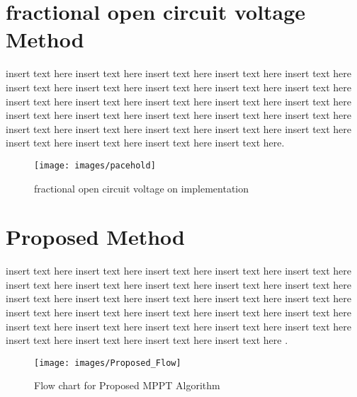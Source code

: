  \section{fractional open circuit voltage Method }
 insert text here insert text here insert text here insert text here insert text here
 insert text here insert text here insert text here insert text here insert text here insert text here insert text here insert text here insert text here insert text here insert text here insert text here insert text here insert text here insert text here insert text here insert text here insert text here insert text here insert text here insert text here insert text here insert text here insert text here.   \\
 \begin{figure}[H]
  \begin{center}
  \texttt{[image: images/pacehold]}
  \caption{ fractional open circuit voltage on implementation}
  \label{fig:Frac_oc_result}
  \end{center}
  \end{figure}
\section{Proposed Method }
insert text here insert text here insert text here insert text here insert text here
insert text here insert text here insert text here insert text here insert text here insert text here insert text here insert text here insert text here insert text here insert text here insert text here insert text here insert text here insert text here insert text here insert text here insert text here insert text here insert text here insert text here insert text here insert text here insert text here . \\

  
  \begin{figure}[H]
   \begin{center}
   \texttt{[image: images/Proposed\_Flow]}
   \caption{ Flow chart for Proposed MPPT Algorithm }
   \label{fig:cyflow}
   \end{center}
  \end{figure}


